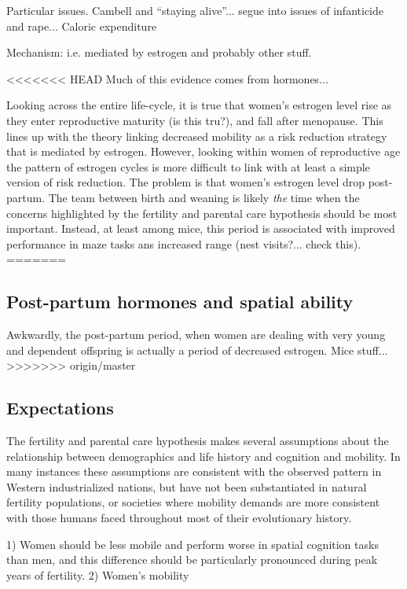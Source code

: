Particular issues.  Cambell and ``staying alive''... segue into issues of infanticide and rape...  Caloric expenditure

Mechanism: i.e. mediated by estrogen and probably other stuff.

<<<<<<< HEAD
Much of this evidence comes from hormones...

Looking across the entire life-cycle, it is true that women's estrogen level rise as they enter reproductive maturity (is this tru?), and fall after menopause.  This lines up with the theory linking decreased mobility as a risk reduction strategy that is mediated by estrogen.  However, looking within women of reproductive age the pattern of estrogen cycles is more difficult to link with at least a simple version of risk reduction.  The problem is that women's estrogen level drop post-partum.  The team between  birth and weaning is likely \emph{the} time when the concerns highlighted by the fertility and parental care hypothesis should be most important. Instead, at least among mice, this period is associated with improved performance in maze tasks ans increased range (nest visits?... check this). 
=======
	\subsection{Post-partum hormones and spatial ability}
	\label{sec:1.2}
Awkwardly, the post-partum period, when women are dealing with very young and dependent offspring is actually a period of decreased estrogen.  Mice stuff...
>>>>>>> origin/master

	\subsection{Expectations}
	\label{sec:1.2}
	
The fertility and parental care hypothesis makes several assumptions about the relationship between demographics and life history and cognition and mobility.  In many instances these assumptions are consistent with the observed pattern in Western industrialized nations, but have not been substantiated in natural fertility populations, or societies where mobility demands are more consistent with those humans faced throughout most of their evolutionary history.

1) Women should be less mobile and perform worse in spatial cognition tasks than men, and this difference should be particularly pronounced during peak years of fertility.  2) Women's mobility 



